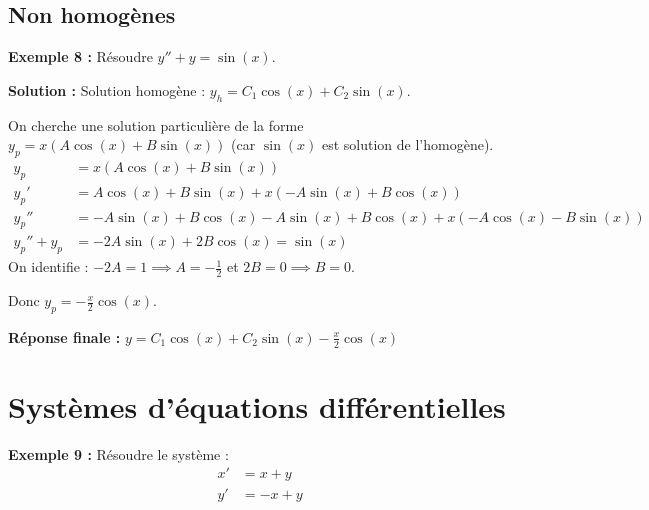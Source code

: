 \documentclass[11pt]{article}
\begin{document}
\newpage

\subsection{Non homogènes}

\textbf{Exemple 8 :} Résoudre $y'' + y = \sin(x)$.

\textbf{Solution :}
Solution homogène : $y_h = C_1 \cos(x) + C_2 \sin(x)$.

On cherche une solution particulière de la forme $y_p = x (A \cos(x) + B \sin(x))$ (car $\sin(x)$ est solution de l'homogène).
\begin{align*}
    y_p &= x (A \cos(x) + B \sin(x)) \\
    y_p' &= A \cos(x) + B \sin(x) + x (-A \sin(x) + B \cos(x)) \\
    y_p'' &= -A \sin(x) + B \cos(x) - A \sin(x) + B \cos(x) + x (-A \cos(x) - B \sin(x)) \\
    y_p'' + y_p &= -2A \sin(x) + 2B \cos(x) = \sin(x)
\end{align*}
On identifie : $-2A = 1 \implies A = -\frac{1}{2}$ et $2B = 0 \implies B = 0$.

Donc $y_p = -\frac{x}{2} \cos(x)$.

\textbf{Réponse finale :} $\boxed{y = C_1 \cos(x) + C_2 \sin(x) - \frac{x}{2} \cos(x)}$

\newpage

\section{Systèmes d'équations différentielles}

\textbf{Exemple 9 :} Résoudre le système :
\begin{align*}
    x' &= x + y \\
    y' &= -x + y
\end{align*}
\end{document}
